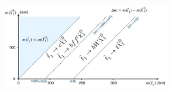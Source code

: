 \begin{figure}[ht!]
  \begin{center}
      \includegraphics[width=0.65\textwidth,]{figures/mstop_mLSP_plane.jpg}
      \caption{}
    \label{fig:mStop_mLsp}
  \end{center}
\end{figure}
